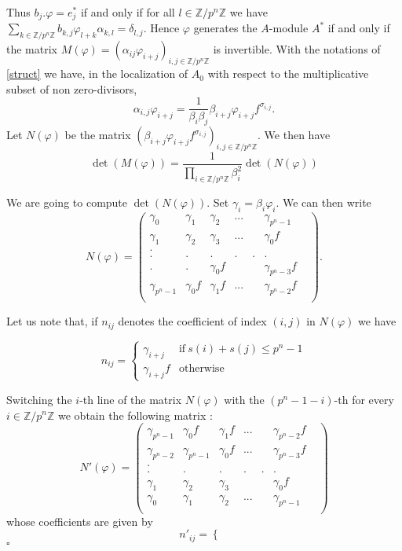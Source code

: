 \documentclass{amsart}
\newenvironment{demo}{{\flushleft \bf Proof~:}}{\hfill $\square$ \vspace{5mm}}
\theoremstyle{definition}
\theoremstyle{remark}
\begin{document}
\begin{demo}
Thus $b_j.\varphi = e_j^*$ if and only if for all $l \in {\mathbb{Z}} / p^n {\mathbb{Z}}$ we have $\displaystyle\sum_{k \in {\mathbb{Z}} / p^n {\mathbb{Z}}} b_{k,j} \varphi_{l+k}\alpha_{k,l} = \delta_{l,j}$. Hence $\varphi$ generates the $A$-module $A^*$ if and only if the matrix $M(\varphi) = (\alpha_{ij} \varphi_{i+j})_{i,j \in {\mathbb{Z}} / p^n {\mathbb{Z}}}$ is invertible. With the notations of \ref{struct} we have, in the localization of $A_0$ with respect to the multiplicative subset of non zero-divisors, 
 \[\alpha_{i,j} \varphi_{i+j} = \frac{1}{\beta_i \beta_j} \beta_{i+j} \varphi_{i+j} f^{\sigma_{i,j}}. \] Let $N(\varphi)$ be the matrix $(\beta_{i+j} \varphi_{i+j} f^{\sigma_{i,j}})_{i,j \in {\mathbb{Z}} / p^n {\mathbb{Z}}}$. We then have \[ \det(M(\varphi)) = \frac{1}{\displaystyle\prod_{i \in {\mathbb{Z}} / p^n {\mathbb{Z}}} \beta_i^2} \det(N(\varphi)) \]
 
We are going to compute $\det(N(\varphi))$. Set $\gamma_i = \beta_i \varphi_i$. We can then write \[ N(\varphi) = \begin{pmatrix}
  \gamma_0 & \gamma_1 & \gamma_2  & ... &  & \gamma_{p^n-1} \\
  \gamma_1 & \gamma_2 & \gamma_3  & ... & & \gamma_0 f  \\
  . &  &  &  &  \\
   . & . & .& .& .&. & \\
   . &. & \gamma_0f& & &  \gamma_{p^n-3} f \\
   \gamma_{p^n-1} &\gamma_0f & \gamma_1f & . .. &  & \gamma_{p^n-2}f \\
\end{pmatrix}. \]
  

Let us note that, if $n_{ij}$ denotes the coefficient of index $(i,j)$ in $N(\varphi)$ we have 

\[ n_{ij} = \begin{cases}
 
 \gamma_{i+j} & \mbox{if} \ s(i) + s(j) \leq p^n -1\\
\gamma_{i+j} f & \mbox{otherwise}
 
 \end{cases}
 \]

Switching the $i$-th line of the matrix $N(\varphi)$ with the $(p^n-1-i)$-th for every $i \in {\mathbb{Z}}/ p^n {\mathbb{Z}}$ we obtain the following matrix : \[N'(\varphi) = 
 \begin{pmatrix}
  \gamma_{p^n-1} & \gamma_0f & \gamma_1f  & ... &  & \gamma_{p^n-2}f \\
  \gamma_{p^n-2} & \gamma_{p^n-1} & \gamma_0f  & ... & & \gamma_{p^n-3} f  \\
  . &  &  &  &  \\
   . & . & .& .& .&. & \\
   \gamma_1 & \gamma_2 & \gamma_3& & &  \gamma_{0} f \\
   \gamma_0 &\gamma_1 & \gamma_2 & . .. &  & \gamma_{p^n-1} \\
\end{pmatrix} \]
 whose coefficients are given by \[ n'_{ij} = \begin{cases}
 

\end{cases}\]
\end{demo}
\end{document}
